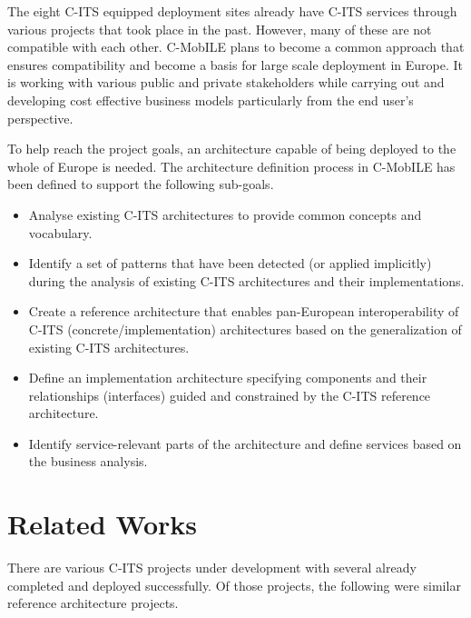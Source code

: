 \documentclass[conference]{IEEEtran}
\begin{document}
The eight C-ITS equipped deployment sites already have C-ITS services through various projects that took place in the past.
However, many of these are not compatible with each other.
C-MobILE plans to become a common approach that ensures compatibility and become a basis for large scale deployment in Europe.
It is working with various public and private stakeholders while carrying out and developing cost effective business models particularly from the end user's perspective.

To help reach the project goals, an architecture capable of being deployed to the whole of Europe is needed.
The architecture definition process in C-MobILE has been defined to support the following sub-goals.

\begin{itemize}
  \item Analyse existing C-ITS architectures to provide common concepts and vocabulary.
  \item Identify a set of patterns that have been detected (or applied implicitly) during the analysis of existing C-ITS architectures and their implementations.
  \item Create a reference architecture that enables pan-European interoperability of C-ITS (concrete/implementation) architectures based on the generalization of existing C-ITS architectures.
  \item Define an implementation architecture specifying components and their relationships (interfaces) guided and constrained by the C-ITS reference architecture.
  \item Identify service-relevant parts of the architecture and define services based on the business analysis.
\end{itemize}

\section{Related Works}
There are various C-ITS projects under development with several already completed and deployed successfully. Of those projects, the following were similar reference architecture projects.
\end{document}
